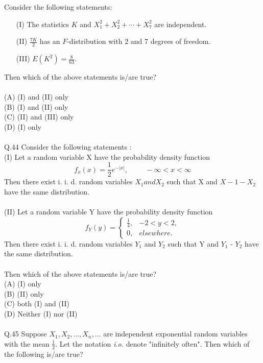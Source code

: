 \documentclass{book}[200pt]
\begin{document}
{Consider the following statements:

\begin{enumerate}
	\item[(I)] The statistics \(K\) and \(X_1^2 + X_2^2 + \cdots + X_7^2\) are independent.
	\item[(II)] \(\frac{7K}{2}\) has an \(F\)-distribution with 2 and 7 degrees of freedom.
	\item[(III)] \(E(K^2) = \frac{8}{63}.\)
\end{enumerate}

Then which of the above statements is/are true?\\
\\
(A) (I) and (II) only\\
(B) (I) and (II) only\\
(C) (II) and (III) only\\
(D) (I) only\\
\\
Q.44 Consider  the following statements :\\
(I) Let a random variable X have the probability density function \[
f_x(x) = \frac{1}{2}e^{-|x|}, \hspace{1cm} -\infty < x < \infty
\]
Then there exist  i. i. d. random variables $X_1 and X_2$ such that X and $X-1 - X_2$ have the same distribution. \\
\\
(II) Let a random variable Y have the probability density function \[
f_Y(y) = \begin{cases}
	\frac{1}{4}, & -2 < y < 2,\\
	0, & elsewhere.
\end{cases}
\]
Then there exist i. i. d. random variables $Y_1$ and $Y_2$ such that Y and $Y_1$ - $Y_2$ have the same distribution.\\
\\
Then which of the above statements is/are true?\\
(A) (I) only\\
(B) (II) only\\
(C) both (I) and (II)\\
(D) Neither (I) nor (II)\\
\\
Q.45 Suppose \(X_1, X_2, \ldots, X_n, \ldots\) are independent exponential random variables with the mean \(\frac{1}{2}\). Let the notation \emph{i.o.} denote "infinitely often". Then which of the following is/are true?\\
\\
}
\end{document}
